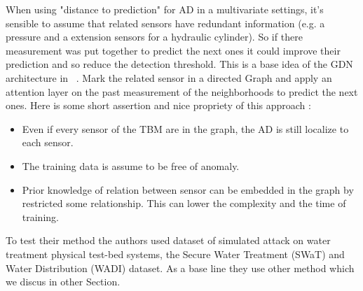 \documentclass[../description.tex]{subfiles}
\begin{document}
    When using "distance to prediction" for AD in a multivariate settings, it's 
    sensible to assume that related sensors have redundant information 
    (e.g. a pressure and a extension sensors for a hydraulic cylinder).
    So if there measurement was put together to predict the next ones 
    it could improve their prediction and so reduce the detection threshold. This is a base idea of the GDN architecture in ~\cite{Deng.2021}.
    Mark the related sensor in a directed Graph
    and apply an attention layer on the past measurement 
    of the neighborhoods to predict the next ones.
    Here is some short assertion and nice propriety of this approach :
    \begin{itemize}
        \item Even if every sensor of the TBM are in the graph, the AD is still localize to each sensor.
        \item The training data is assume to be free of anomaly.
        \item Prior knowledge of relation between sensor can be embedded in the graph by restricted some relationship. 
        This can lower the complexity and the time of training.
    \end{itemize}

    To test their method the authors used dataset of simulated attack on water treatment physical test-bed systems, 
    the Secure Water Treatment (SWaT) and Water Distribution (WADI) dataset. As a base line they use other method which we discus in other Section.
    
\end{document}
